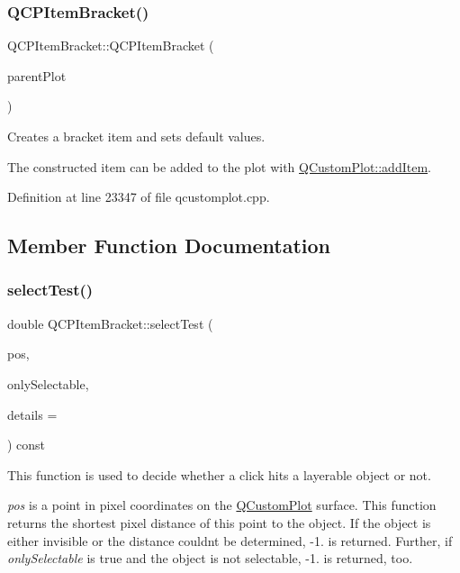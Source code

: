 \subsubsection{\texorpdfstring{Q\+C\+P\+Item\+Bracket()}{QCPItemBracket()}}
{\footnotesize\ttfamily Q\+C\+P\+Item\+Bracket\+::\+Q\+C\+P\+Item\+Bracket (\begin{DoxyParamCaption}\item[{\hyperlink{class_q_custom_plot}{Q\+Custom\+Plot} $\ast$}]{parent\+Plot }\end{DoxyParamCaption})}

Creates a bracket item and sets default values.

The constructed item can be added to the plot with \hyperlink{class_q_custom_plot_aa500620379262321685cb7a7674cbd2a}{Q\+Custom\+Plot\+::add\+Item}. 

Definition at line 23347 of file qcustomplot.\+cpp.



\subsection{Member Function Documentation}
\mbox{\label{class_q_c_p_item_bracket_a971299aa6fef75730d6f10efdaf48616}} 
\subsubsection{\texorpdfstring{select\+Test()}{selectTest()}}
{\footnotesize\ttfamily double Q\+C\+P\+Item\+Bracket\+::select\+Test (\begin{DoxyParamCaption}\item[{const Q\+PointF \&}]{pos,  }\item[{bool}]{only\+Selectable,  }\item[{Q\+Variant $\ast$}]{details = {} }\end{DoxyParamCaption}) const\hspace{0.3cm}{\ttfamily [virtual]}}

This function is used to decide whether a click hits a layerable object or not.

{\itshape pos} is a point in pixel coordinates on the \hyperlink{class_q_custom_plot}{Q\+Custom\+Plot} surface. This function returns the shortest pixel distance of this point to the object. If the object is either invisible or the distance couldn\textquotesingle{}t be determined, -\/1. is returned. Further, if {\itshape only\+Selectable} is true and the object is not selectable, -\/1. is returned, too.

